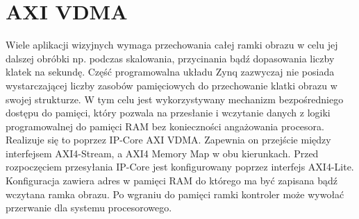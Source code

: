 \section{AXI VDMA}

Wiele aplikacji wizyjnych wymaga przechowania całej ramki obrazu w celu jej dalszej obróbki np. podczas skalowania, przycinania bądź dopasowania liczby klatek na sekundę. 
Część programowalna układu Zynq zazwyczaj nie posiada wystarczającej liczby zasobów pamięciowych do przechowanie klatki obrazu w swojej strukturze. 
W tym celu jest wykorzystywany mechanizm bezpośredniego dostępu do pamięci, który pozwala na przesłanie i wczytanie danych z logiki programowalnej do pamięci RAM bez konieczności angażowania procesora. %
Realizuje się to poprzez IP-Core AXI VDMA. 
Zapewnia on przejście między interfejsem AXI4-Stream, a AXI4 Memory Map w obu kierunkach. 
Przed rozpoczęciem przesyłania IP-Core jest konfigurowany poprzez interfejs AXI4-Lite. 
Konfiguracja zawiera adres w pamięci RAM do którego ma być zapisana bądź wczytana ramka obrazu. 
Po wgraniu do pamięci ramki kontroler może wywołać przerwanie dla systemu procesorowego.